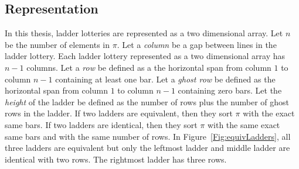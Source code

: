 \subsection{Representation}
In this thesis, ladder lotteries are represented as a two dimensional array.
Let $n$ be the number of elements in $\pi$. Let a \emph{column} be a gap 
between lines in the ladder lottery. Each ladder lottery 
represented as a two dimensional array has $n-1$ columns. Let a \emph{row} 
be defined as a the horizontal span from column $1$ to column $n-1$ containing at least one bar. 
Let a \emph{ghost row} be defined as the horizontal span from column $1$ to column $n-1$ containing zero bars.
Let the \emph{height} of the ladder be defined as the number of 
rows plus the number of ghost rows in the ladder.
If two ladders are equivalent, then they sort $\pi$ with 
the exact same bars. If two ladders are identical, 
then they sort $\pi$ with the same exact same bars and with the same number of rows. 
In Figure~\ref{Fig:equivLadders}, all three ladders are equivalent but only the leftmost ladder 
and middle ladder are identical with two rows. The rightmost ladder 
has three rows. 
